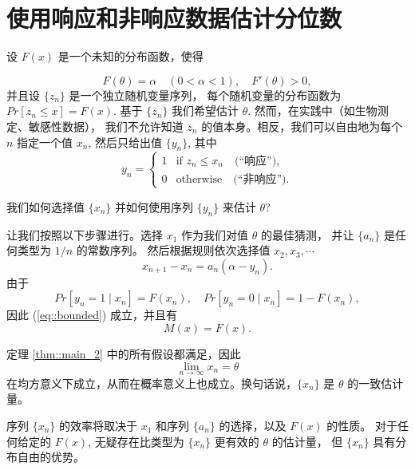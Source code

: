 \documentclass{article}
\begin{document}
\section{使用响应和非响应数据估计分位数}
\label{sec::response}

设 $F(x)$ 是一个未知的分布函数，使得

\begin{equation}
    F(\theta) = \alpha \quad (0 < \alpha < 1), \quad F'(\theta) > 0,
\end{equation}
并且设 $\{z_n\}$ 是一个独立随机变量序列，
每个随机变量的分布函数为 $Pr[z_n \leq x] = F(x)$. 
基于 $\{z_n\}$ 我们希望估计 $\theta$. 然而，在实践中（如生物测定、敏感性数据），
我们不允许知道 $z_n$ 的值本身。相反，我们可以自由地为每个 $n$ 指定一个值 $x_n$, 
然后只给出值 $\{y_n\}$, 其中
\begin{equation}
    \label{eq::response}
    y_n = 
    \begin{cases}
        1 & \text{if } z_n \leq x_n \quad \text{(``响应'')}, \\
        0 & \text{otherwise} \quad \text{(``非响应'')}.
    \end{cases}
\end{equation}

我们如何选择值 $\{x_n\}$ 并如何使用序列 $\{y_n\}$ 来估计 $\theta$?

让我们按照以下步骤进行。选择 $x_1$ 作为我们对值 $\theta$ 的最佳猜测，
并让 $\{a_n\}$ 是任何类型为 $1/n$ 的常数序列。
然后根据规则依次选择值 $x_2, x_3, \cdots$
\begin{equation}
    x_{n+1} - x_n = a_n (\alpha - y_n).
\end{equation}
由于
\begin{equation}
    Pr[y_n = 1 \mid x_n] = F(x_n), \quad Pr[y_n = 0 \mid x_n] = 1 - F(x_n),
\end{equation}
因此 (\ref{eq::bounded}) 成立，并且有
\begin{equation}
    M(x) = F(x).
\end{equation}

定理 \ref{thm::main_2} 中的所有假设都满足，因此
\begin{equation}
    \label{eq::convergence_theta}
    \lim_{n \to \infty} x_n = \theta
\end{equation}
在均方意义下成立，从而在概率意义上也成立。换句话说，$\{x_n\}$ 是 $\theta$ 的一致估计量。

序列 $\{x_n\}$ 的效率将取决于 $x_1$ 和序列 $\{a_n\}$ 的选择，以及 $F(x)$ 的性质。
对于任何给定的 $F(x)$, 无疑存在比类型为 $\{x_n\}$ 更有效的 $\theta$ 的估计量，
但 $\{x_n\}$ 具有分布自由的优势。
\end{document}
